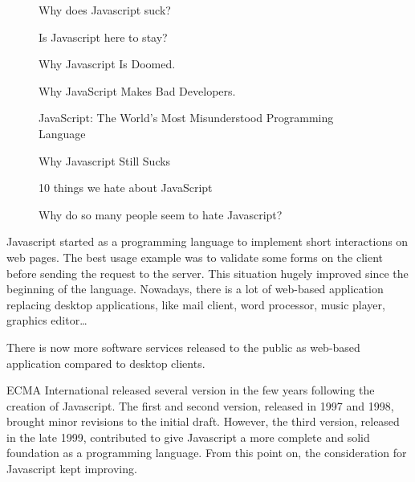 \begin{figure}[h!]
{
\fontsize{10pt}{10pt}\selectfont
Why does Javascript suck?

Is Javascript here to stay?

Why Javascript Is Doomed.

Why JavaScript Makes Bad Developers.

JavaScript: The World's Most Misunderstood Programming Language

Why Javascript Still Sucks

10 things we hate about JavaScript

Why do so many people seem to hate Javascript?
}
\end{figure}

Javascript started as a programming language to implement short interactions on web pages.
The best usage example was to validate some forms on the client before sending the request to the server.
This situation hugely improved since the beginning of the language.
Nowadays, there is a lot of web-based application replacing desktop applications, like mail client, word processor, music player, graphics editor…

There is now more software services released to the public as web-based application compared to desktop clients.

ECMA International released several version in the few years following the creation of Javascript.
The first and second version, released in 1997 and 1998, brought minor revisions to the initial draft.
However, the third version, released in the late 1999, contributed to give Javascript a more complete and solid foundation as a programming language.
From this point on, the consideration for Javascript kept improving.

